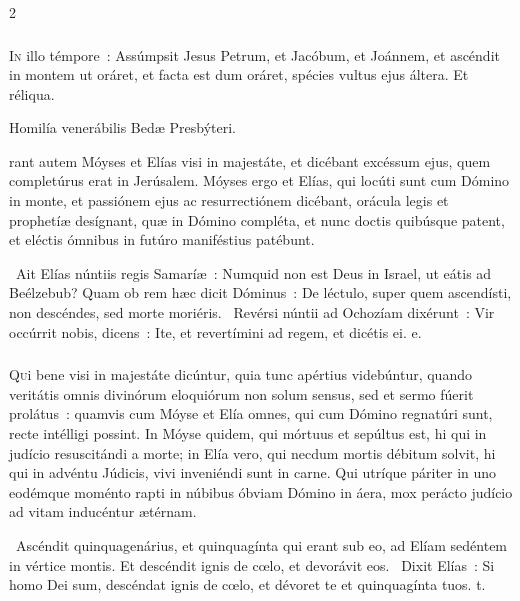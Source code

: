 \documentclass[9pt,twoside]{extarticle}
\begin{document}
\begin{multicols}{2}
{{{\subsubsection*{\center {}}
\lettrine{I}n illo témpore~: Assúmpsit Jesus Petrum, et Jacóbum, et Joánnem, et ascéndit in montem ut oráret, et facta est dum oráret, spécies vultus ejus áltera. Et réliqua. 

\begin{center}Homilía venerábilis Bedæ Presbýteri.\end{center}
rant autem Móyses et Elías visi in majestáte, et dicébant excéssum ejus, quem completúrus erat in Jerúsalem. Móyses ergo et Elías, qui locúti sunt cum Dómino in monte, et passiónem ejus ac resurrectiónem dicébant, orácula legis et prophetíæ desígnant, quæ in Dómino compléta, et nunc doctis quibúsque patent, et eléctis ómnibus in futúro maniféstius patébunt.

\begin{tightlist}{}
\item {}~Ait Elías núntiis regis Samaríæ~: Numquid non est Deus in Israel, ut eátis ad Beélzebub? Quam ob rem hæc dicit Dóminus~: \textred{*} De léctulo, super quem ascendísti, non descéndes, sed morte moriéris. ~Revérsi núntii ad Ochozíam dixérunt~: Vir occúrrit nobis, dicens~: Ite, et revertímini ad regem, et dicétis ei. e.
\end{tightlist}

\subsubsection*{\center {}}
\lettrine{Q}ui bene visi in majestáte dicúntur, quia tunc apértius videbúntur, quando veritátis omnis divinórum eloquiórum non solum sensus, sed et sermo fúerit prolátus~: quamvis cum Móyse et Elía omnes, qui cum Dómino regnatúri sunt, recte intélligi possint. In Móyse quidem, qui mórtuus et sepúltus est, hi qui in judício resuscitándi a morte; in Elía vero, qui necdum mortis débitum solvit, hi qui in advéntu Júdicis, vivi inveniéndi sunt in carne. Qui utríque páriter in uno eodémque moménto rapti in núbibus óbviam Dómino in áera, mox perácto judício ad vitam inducéntur ætérnam.

\begin{tightlist}{}
\item {}~Ascéndit quinquagenárius, et quinquagínta qui erant sub eo, ad Elíam sedéntem in vértice montis. \textred{*} Et descéndit ignis de cœlo, et devorávit eos. ~Dixit Elías~: Si homo Dei sum, descéndat ignis de cœlo, et dévoret te et quinquagínta tuos. t.
\end{tightlist}

}}}
\end{multicols}
\end{document}
